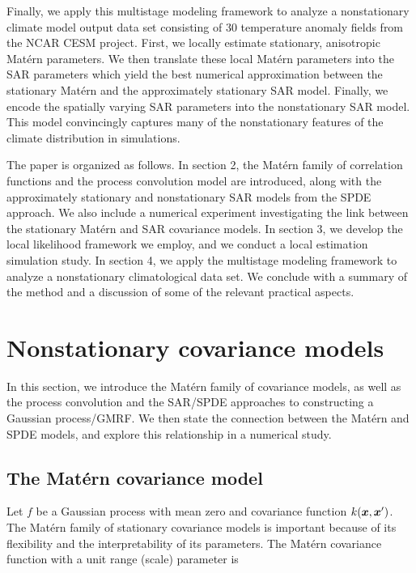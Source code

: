 \documentclass[review]{elsarticle}
\begin{document}
Finally, we apply this multistage modeling framework to analyze a nonstationary climate model output data set consisting of 30 temperature anomaly fields from the NCAR CESM project. First, we locally estimate stationary, anisotropic Mat\'ern parameters. We then translate these local Mat\'ern parameters into the SAR parameters which yield the best numerical approximation between the stationary Mat\'ern and the approximately stationary SAR model. Finally, we encode the spatially varying SAR parameters into the nonstationary SAR model. This model convincingly captures many of the nonstationary features of the climate distribution in simulations. 


The paper is organized as follows. In section 2, the Mat\'ern family of correlation functions and the process convolution model are introduced, along with the approximately stationary and nonstationary SAR models from the SPDE approach. We also include a numerical experiment investigating the link between the stationary Mat\'ern and SAR covariance models. In section 3, we develop the local likelihood framework we employ, and we conduct a local estimation simulation study.  In section 4, we apply the multistage modeling framework to analyze a nonstationary climatological data set. We conclude with a summary of the method and a discussion of some of the relevant practical aspects.














\section{Nonstationary covariance models}

 In this section, we introduce the Mat\'ern family of covariance models, as well as the process convolution and the SAR/SPDE approaches to constructing a Gaussian process/GMRF. We then state the connection between the Mat\'ern and SPDE models, and explore this relationship in a numerical study.


\subsection{The Mat\'ern covariance model}
\label{ss:2.1}

Let $f$ be a Gaussian process with mean zero and covariance function  $k( \mbox{\boldmath $x$}, \mbox{\boldmath $x$}^\prime)$.
The Mat\'ern family of stationary covariance models is important because of its flexibility and the interpretability of its parameters. The  Mat\'ern covariance function with a unit range (scale) parameter is
\end{document}
